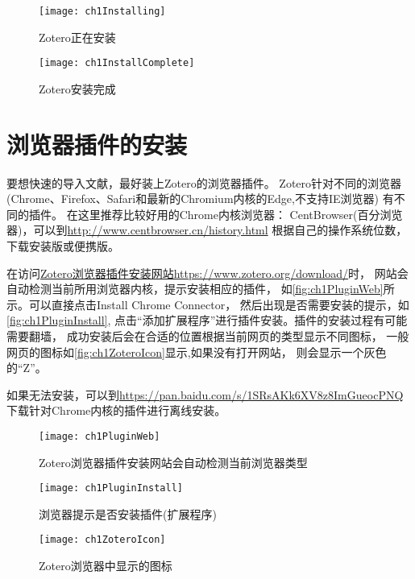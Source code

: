 \documentclass[cn,11pt,chinese]{elegantbook}
\begin{document}
			
			\begin{figure}[htbp]
				\noindent
				\begin{minipage}[t]{\dimexpr0.5\textwidth-4em}
					\centering
					\texttt{[image: ch1Installing]}
					\caption{Zotero正在安装}
					\label{fig:ch1Installing}
				\end{minipage}
				\hspace{1cm}	
				\noindent
				\begin{minipage}[t]{\dimexpr0.5\textwidth-4em}
					\centering
					\texttt{[image: ch1InstallComplete]}
					\caption{Zotero安装完成}
					\label{fig:ch1InstallComplete}	
				\end{minipage}
			\end{figure}	
			
		
	\section{浏览器插件的安装} 
	要想快速的导入文献，最好装上Zotero的浏览器插件。
	Zotero针对不同的浏览器(Chrome、Firefox、Safari和最新的Chromium内核的Edge,不支持IE浏览器)
	有不同的插件。	在这里推荐比较好用的Chrome内核浏览器：
	CentBrowser(百分浏览器)，可以到\url{http://www.centbrowser.cn/history.html}
	根据自己的操作系统位数，下载安装版或便携版。
	
	在访问\href{https://www.zotero.org/download/}
	{Zotero浏览器插件安装网站https://www.zotero.org/download/}时，
	网站会自动检测当前所用浏览器内核，提示安装相应的插件，
	如\autoref{fig:ch1PluginWeb}所示。可以直接点击Install Chrome Connector，
	然后出现是否需要安装的提示，如\autoref{fig:ch1PluginInstall},
	点击“添加扩展程序”进行插件安装。插件的安装过程有可能需要翻墙，
	成功安装后会在合适的位置根据当前网页的类型显示不同图标，
	一般网页的图标如\autoref{fig:ch1ZoteroIcon}显示,如果没有打开网站，
	则会显示一个灰色的“Z”。
	  
	  如果无法安装，可以到\href{https://pan.baidu.com/s/1SRsAKk6XV8z8ImGueocPNQ}
	{https://pan.baidu.com/s/1SRsAKk6XV8z8ImGueocPNQ}下载针对Chrome内核的插件进行离线安装。
	\begin{figure}[htbp]
		\centering
		\texttt{[image: ch1PluginWeb]}
		\caption{Zotero浏览器插件安装网站会自动检测当前浏览器类型}
		\label{fig:ch1PluginWeb}
	\end{figure}
	\begin{figure}[htbp]
		\centering
		\texttt{[image: ch1PluginInstall]}
		\caption{浏览器提示是否安装插件(扩展程序)}
		\label{fig:ch1PluginInstall}
	\end{figure}
	\begin{figure}[htbp]
		\centering
		\texttt{[image: ch1ZoteroIcon]}
		\caption{Zotero浏览器中显示的图标}
		\label{fig:ch1ZoteroIcon}
	\end{figure}
	
\end{document}
